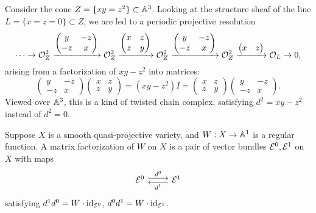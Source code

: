 Consider the cone $Z=\{xy=z^2\}\subset\mathbb{A}^3$. Looking at the structure sheaf of
the line $L=\{x=z=0\}\subset Z$, we are led to a periodic projective resolution
\begin{equation}\label{eqn:coneMF}
    \cdots \to
    \mathcal{O}_Z^2 \xrightarrow{\begin{pmatrix}
        y & -z \\ -z & x
    \end{pmatrix}}
    \mathcal{O}_Z^2 \xrightarrow{\begin{pmatrix}
        x & z \\ z & y
    \end{pmatrix}}
    \mathcal{O}_Z^2 \xrightarrow{\begin{pmatrix}
        y & -z \\ -z & x
    \end{pmatrix}}
    \mathcal{O}_Z^2 \xrightarrow{\begin{pmatrix}
        x & z
    \end{pmatrix}}
    \mathcal{O}_L\to0,
\end{equation}
arising from a factorization of $xy-z^2$ into matrices:
\begin{equation*}
    \begin{pmatrix}
        y & -z \\ -z & x
    \end{pmatrix}
    \begin{pmatrix}
        x & z \\ z & y
    \end{pmatrix}
        = (xy-z^2)I =
    \begin{pmatrix}
        x & z \\ z & y
    \end{pmatrix}
    \begin{pmatrix}
        y & -z \\ -z & x
    \end{pmatrix}.
\end{equation*}
Viewed over $\mathbb{A}^3$, this is a kind of twisted chain complex, satisfying
$d^2=xy-z^2$ instead of $d^2=0$.

\begin{definition}{}{}
    Suppose $X$ is a smooth quasi-projective variety, and $W:X\to\mathbb{A}^1$ is a
    regular function. A matrix factorization of $W$ on $X$ is a pair of vector
    bundles $\mathcal{E}^0,\mathcal{E}^1$ on $X$ with maps
    \begin{equation*}
        \begin{tikzcd}
            \calE^0 \ar[r,"d^0",shift left] & \calE^1 \ar[l,"d^1",shift left]
        \end{tikzcd}
    \end{equation*}
    satisfying $d^1d^0=W\cdot\mathrm{id}_{\mathcal{E}^0}$, $d^0d^1=W\cdot\mathrm{id}_{\mathcal{E}^1}$.
\end{definition}

